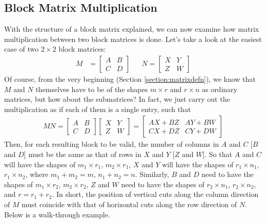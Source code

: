 \subsection{Block Matrix Multiplication}
\label{subsection:blockmul}

With the structure of a block matrix explained, we can now examine how matrix multiplication between two block matrices is done. Let's take a look at the easiest case of two $2 \times 2$ block matrices:
\begin{align*}
M &=
\begin{bmatrix}
A & B \\
C & D
\end{bmatrix} 
& &
N =
\begin{bmatrix}
X & Y \\
Z & W
\end{bmatrix} 
\end{align*}
Of course, from the very beginning (Section \ref{section:matrixdefn}), we know that $M$ and $N$ themselves have to be of the shapes $m \times r$ and $r \times n$ as ordinary matrices, but how about the submatrices? In fact, we just carry out the multiplication as if each of them is a single entry, such that
\begin{align}
MN = 
\begin{bmatrix}
A & B \\
C & D
\end{bmatrix} 
\begin{bmatrix}
X & Y \\
Z & W
\end{bmatrix} 
=
\begin{bmatrix}
AX + BZ & AY + BW \\
CX + DZ & CY + DW
\end{bmatrix}
\label{eqn:22blockmul}
\end{align}
Then, for each resulting block to be valid, the number of columns in $A$ and $C$ [$B$ and $D$] must be the same as that of rows in $X$ and $Y$ [$Z$ and $W$]. So that $A$ and $C$ will have the shapes of $m_1 \times r_1$, $m_2 \times r_1$, $X$ and $Y$ will have the shapes of $r_1 \times n_1$, $r_1 \times n_2$, where $m_1 + m_2 = m$, $n_1 + n_2 = n$. Similarly, $B$ and $D$ need to have the shapes of $m_1 \times r_2$, $m_2 \times r_2$, $Z$ and $W$ need to have the shapes of $r_2 \times n_1$, $r_2 \times n_2$, and $r = r_1 + r_2$. In short, the position of vertical cuts along the column direction of $M$ must coincide with that of horizontal cuts along the row direction of $N$. Below is a walk-through example.

